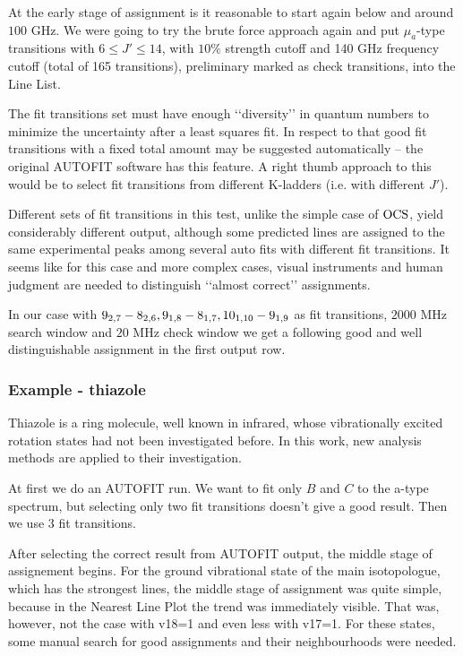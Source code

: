 \documentclass[11pt]{article}
\begin{document}
At the early stage of assignment is it reasonable to start again below and around $100$ GHz. We were going to try the brute force approach again and put $\mu_a$-type transitions with $6 \leq J' \leq 14$, with $10\%$ strength cutoff and 140 GHz frequency cutoff (total of 165 transitions), preliminary marked as check transitions, into the Line List.  

The fit transitions set must have enough  \lq\lq{}diversity\rq\rq{} in quantum numbers to minimize the uncertainty after a least squares fit. In respect to that good fit transitions with a fixed total amount may be suggested automatically -- the original AUTOFIT software has this feature. A right thumb approach to this would be to select fit transitions from different K-ladders (i.e. with different $J'$).

Different sets of fit transitions in this test, unlike the simple case of $\rm OCS$, yield considerably different output, although some predicted lines are assigned to the same experimental peaks among several auto fits with different fit transitions. It seems like for this case and more complex cases, visual instruments and human judgment are needed to distinguish \lq\lq{}almost correct\rq\rq{} assignments.

In our case with $\rm 9_{2,7}-8_{2,6}, 9_{1,8}-8_{1,7}, 10_{1,10}-9_{1,9}$ as fit transitions, $2000$ MHz search window and $20$ MHz check window we get a following good and well distinguishable assignment in the first output row. 
 
 
\subsubsection{Example - thiazole}

Thiazole is a ring molecule, well known in infrared, whose vibrationally excited rotation states had not been investigated before. In this work, new analysis methods are applied to their investigation.

At first we do an AUTOFIT run. We want to fit only $B$ and $C$ to the a-type spectrum, but selecting only two fit transitions doesn't give a good result.  Then we use $3$ fit transitions. 

After selecting the correct result from AUTOFIT output, the middle stage of assignement begins. For the ground vibrational state of the main isotopologue, which has the strongest lines, the middle stage of assignment was quite simple, because in the Nearest Line Plot the trend was immediately visible. That was, however, not the case with v18=1 and even less with v17=1. For these states, some manual search for good assignments and their neighbourhoods were needed.
\end{document}
